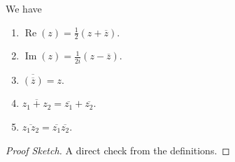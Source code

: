\documentclass[a4]{scrreprt}
\begin{document}
\begin{proposition}
	We have
	\begin{enumerate}[label=(\roman*)]
		\item $\operatorname{Re}(z) = \frac{1}{2}(z + \overline{z})$.
		\item $\operatorname{Im}(z) = \frac{1}{2i}(z - \overline{z})$.
		\item $\overline{(\overline{z})} = z$.
		\item $\overline{z_1 + z_2} = \overline{z_1} + \overline{z_2}$.
		\item $\overline{z_1 z_2} = \overline{z_1} \overline{z_2}$.
	\end{enumerate}
\end{proposition}
\begin{proof}[Proof Sketch]
	A direct check from the definitions.
\end{proof}
\end{document}
